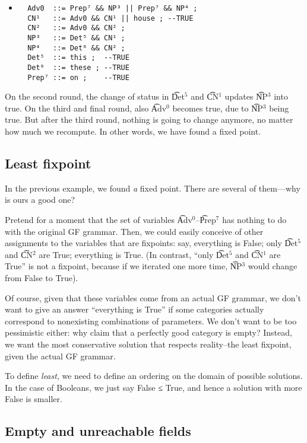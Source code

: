 \begin{itemize}
\item[]
\begin{verbatim}
  Adv0  ::= Prep⁷ && NP³ || Prep⁷ && NP⁴ ;
  CN¹   ::= Adv0 && CN¹ || house ; --TRUE
  CN²   ::= Adv0 && CN² ;
  NP³   ::= Det⁵ && CN¹ ;
  NP⁴   ::= Det⁶ && CN² ;
  Det⁵  ::= this ;  --TRUE
  Det⁶  ::= these ; --TRUE
  Prep⁷ ::= on ;    --TRUE
\end{verbatim}
\end{itemize}

On the second round, the change of status in \t{Det$^\text{5}$} and \t{CN$^\text{1}$} updates \t{NP$^\text{3}$} into true. On the third and final round, also  \t{Adv$^\text{0}$} becomes true, due to \t{NP$^\text{3}$} being true. But after the third round, nothing is going to change anymore, no matter how much we recompute. In other words, we have found a fixed point.

\subsection{Least fixpoint}

In the previous example, we found \emph{a} fixed point. There are several of them---why is ours a good one?

Pretend for a moment that the set of variables  \t{Adv$^\text{0}$}--\t{Prep$^\text{7}$} has nothing to do with the original GF grammar. Then, we could easily conceive of other assignments to the variables that are fixpoints: say, everything is False; only \t{Det$^\text{5}$} and \t{CN$^\text{2}$} are True; everything is True. (In contrast, “only \t{Det$^\text{5}$} and \t{CN$^\text{1}$} are True” is not a fixpoint, because if we iterated one more time, \t{NP$^\text{3}$} would change from False to True).

Of course, given that these variables come from an actual GF grammar, we don’t want to give an answer “everything is True” if some categories actually correspond to nonexisting combinations of parameters. We don’t want to be too pessimistic either: why claim that a perfectly good category is empty? Instead, we want the most conservative solution that respects reality--the least fixpoint, given the actual GF grammar.

To define \emph{least}, we need to define an ordering on the domain of possible solutions. In the case of Booleans, we just say False ≤ True, and hence a solution with more False is smaller.

\subsection{Empty and unreachable fields}


